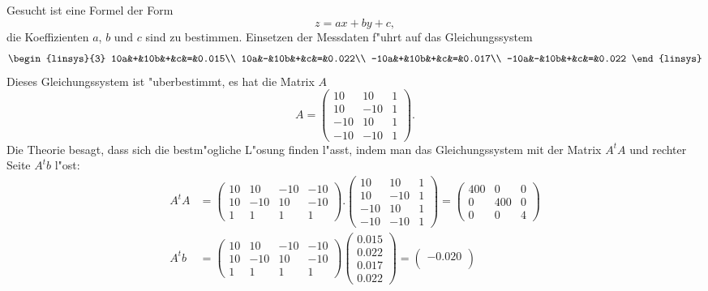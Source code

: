 \begin{loesung}
\begin{teilaufgaben}
\item
Gesucht ist eine Formel der Form
\[
z=ax+by+c,
\]
die Koeffizienten $a$, $b$ und $c$ sind zu bestimmen. Einsetzen der Messdaten
f"uhrt auf das Gleichungssystem
\[
\begin{linsys}{3}
 10a&+&10b&+&c&=&0.015\\
 10a&-&10b&+&c&=&0.022\\
-10a&+&10b&+&c&=&0.017\\
-10a&-&10b&+&c&=&0.022
\end{linsys}
\]
Dieses Gleichungssystem ist "uberbestimmt, es hat die Matrix $A$
\[
A
=
\begin{pmatrix}
 10& 10&1\\
 10&-10&1\\
-10& 10&1\\
-10&-10&1
\end{pmatrix}.
\]
Die Theorie besagt, dass sich die bestm"ogliche L"osung finden l"asst,
indem man das Gleichungssystem mit der Matrix $A^tA$ und rechter Seite
$A^tb$ l"ost:
\begin{align*}
A^tA
&=
\begin{pmatrix}
 10& 10&-10&-10\\
 10&-10& 10&-10\\
  1&  1&  1&  1
\end{pmatrix}.
\begin{pmatrix}
 10& 10&1\\
 10&-10&1\\
-10& 10&1\\
-10&-10&1
\end{pmatrix}
=
\begin{pmatrix}
400&  0&  0\\
  0&400&  0\\
  0&  0&  4
\end{pmatrix}
\\
A^tb
&=
\begin{pmatrix}
 10& 10&-10&-10\\
 10&-10& 10&-10\\
  1&  1&  1&  1
\end{pmatrix}
\begin{pmatrix}
0.015\\0.022\\0.017\\0.022
\end{pmatrix}
=
\begin{pmatrix}
-0.020\\

\end{pmatrix}
\end{align*}
\end{teilaufgaben}
\end{loesung}
